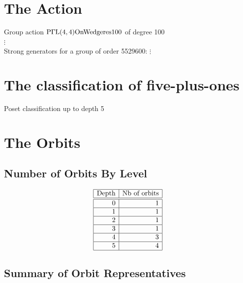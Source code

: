 \section*{The Action}
Group action ${\rm P}\Gamma {\rm L}(4,4) {\rm OnWedge} {\rm res100}$ of degree 100\\
$\vdots$\\
Strong generators for a group of order 5529600:
$\vdots$\\
\section*{The classification of five-plus-ones}
Poset classification up to depth 5\\

\section*{The Orbits}

\subsection*{Number of Orbits By Level}
$$
\begin{array}{|r|r|}
\hline
\mbox{Depth} & \mbox{Nb of orbits}\\
\hline
\hline
0 & 1\\
\hline
1 & 1\\
\hline
2 & 1\\
\hline
3 & 1\\
\hline
4 & 3\\
\hline
5 & 4\\
\hline
\end{array}
$$


\subsection*{Summary of Orbit Representatives}


